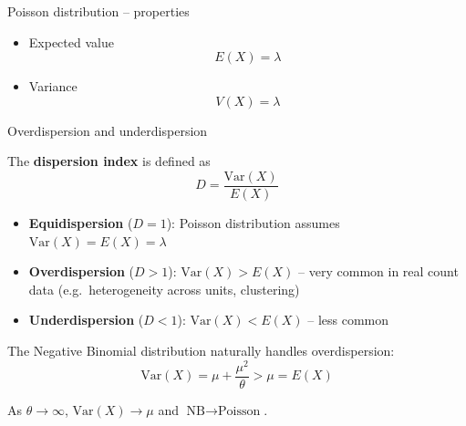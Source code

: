 \documentclass[10pt,ignorenonframetext,aspectratio=169]{beamer}
\begin{document}
\begin{frame}{Poisson distribution -- properties}

\begin{itemize}
    \item Expected value 
        \begin{equation}
            E(X) = \lambda
        \end{equation}
    \item Variance
            \begin{equation}
            V(X) = \lambda
        \end{equation}
\end{itemize}
\end{frame}

\begin{frame}{Overdispersion and underdispersion}

The \textbf{dispersion index} is defined as
\begin{equation}
    D = \frac{\text{Var}(X)}{E(X)}
\end{equation}

\begin{itemize}
    \item \textbf{Equidispersion} ($D = 1$): Poisson distribution assumes $\text{Var}(X) = E(X) = \lambda$
    \item \textbf{Overdispersion} ($D > 1$): $\text{Var}(X) > E(X)$ -- very common in real count data (e.g.\ heterogeneity across units, clustering)
    \item \textbf{Underdispersion} ($D < 1$): $\text{Var}(X) < E(X)$ -- less common
\end{itemize}

\vspace{0.3cm}

The Negative Binomial distribution naturally handles overdispersion:
\begin{equation}
    \text{Var}(X) = \mu + \frac{\mu^2}{\theta} > \mu = E(X)
\end{equation}

As $\theta \to \infty$, $\text{Var}(X) \to \mu$ and $\text{NB} \to \text{Poisson}$.

\end{frame}

\end{document}
